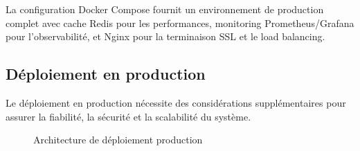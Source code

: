 La configuration Docker Compose fournit un environnement de production complet avec cache Redis pour les performances, monitoring Prometheus/Grafana pour l'observabilité, et Nginx pour la terminaison SSL et le load balancing.

\subsection{Déploiement en production}

Le déploiement en production nécessite des considérations supplémentaires pour assurer la fiabilité, la sécurité et la scalabilité du système.

\begin{figure}[H]
\centering
{}
\caption{Architecture de déploiement production}
\end{figure}

